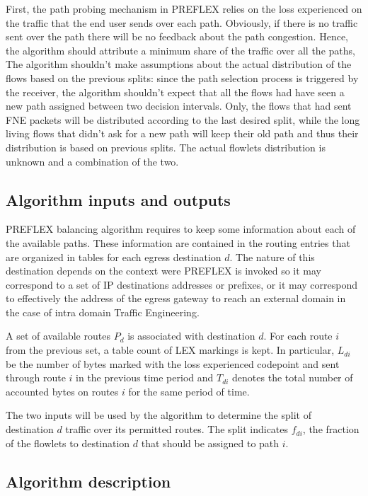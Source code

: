 First, the path probing mechanism in PREFLEX relies on the loss experienced on the traffic that the end user sends over each path. Obviously, if  there is no traffic sent over the path there will be no feedback about the path congestion. Hence, the algorithm should attribute a minimum share of the traffic over all the paths,
The algorithm shouldn't make assumptions about the actual distribution of the flows based on the previous splits: since the path selection process is triggered by the receiver, the algorithm shouldn't expect that all the flows had have seen a new path assigned between two decision intervals. Only, the flows that had sent FNE packets will be distributed according to the last desired split, while the long living flows that didn't ask for a new path will keep their old path and thus their distribution is based on previous splits. The actual flowlets distribution is unknown and a combination of the two.

\subsection{Algorithm inputs and outputs}

PREFLEX balancing algorithm requires to keep some information about each of the available paths. These information are contained in the routing entries that are organized in tables for each egress destination $d$. The nature of this destination depends on the context were PREFLEX is invoked so it may correspond to a set of IP destinations addresses or prefixes, or it may correspond to effectively the  address of the egress gateway to reach an external domain in the case of intra domain Traffic Engineering. 

A set of available routes $P_{d}$ is associated with destination $d$. For each route $i$ from the previous set, a table count of LEX markings is kept. In particular, $L_{di}$ be the number of bytes marked with the loss experienced codepoint and sent through route $i$ in the previous time period and $T_{di}$ denotes the total number of accounted bytes on routes $i$ for the same period of time. 

The two inputs will be used by the algorithm to determine the split of destination $d$ traffic over its permitted routes. The split indicates $f_{di}$, the fraction of the flowlets to destination $d$ that should be assigned to path $i$. 

\subsection{Algorithm description}

